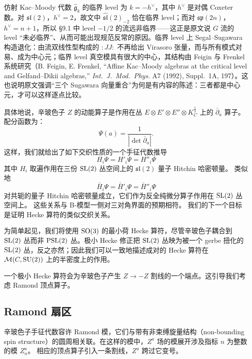 \begin{yizhu}
仿射 Kac–Moody 代数 $\hat{\mathfrak g}_k$ 的临界 level 为 $k=-h^\vee$，其中 $h^\vee$ 是对偶 Coxeter 数。对 $\mathfrak{sl}(2)$，$h^\vee=2$，故文中 $\widehat{\mathfrak{sl}}(2)_{-2}$ 恰在临界 level；而对 $\mathfrak{sp}(2n)$，$h^\vee=n+1$，所以 §9.1 中 level $-1/2$ 的流远非临界——这正是原文说 $G$ 流的 level “未必临界”、从而可能出现规范反常的原因。临界 level 上 Segal–Sugawara 构造退化：由流双线性型构成的 $:JJ:$ 不再给出 Virasoro 张量，而与所有模式对易、成为中心元；临界 level 真空模具有很大的中心，其结构由 Feigin 与 Frenkel 系统研究（B. Feigin, E. Frenkel, ``Affine Kac--Moody algebras at the critical level and Gelfand--Dikii algebras,'' \emph{Int.\ J.\ Mod.\ Phys.} A7 (1992), Suppl.~1A, 197）。这也说明原文强调“三个 Sugawara 向量重合”为何是有内容的陈述：三者都是中心元，才可以这样逐点比较。
\end{yizhu}

具体地说，辛玻色子 $Z$ 的动能算子是作用在丛 $E \otimes E' \otimes E'' \otimes K_C^{\frac12}$ 上的 $\bar \partial_{a}$ 算子。
配分函数为： 
\begin{equation}\label{sqr}
\Psi(a) = \frac{1}{|\det \bar \partial_a|}.
\end{equation}  
这样，我们就给出了如下交织性质的一个手征代数推导
\begin{equation}
\boxed{H_i \Psi = H'_i \Psi = H''_i \Psi}
\end{equation}
其中 $H_i$ 取遍作用在三份 ${\mathrm{SL}}(2)$ 丛空间上的 $\mathfrak{sl}(2)$ 量子 Hitchin 哈密顿量。
类似地
\begin{equation}
\boxed{\bar H_i \Psi = \bar H'_i \Psi = \bar H''_i \Psi}
\end{equation}
对共轭的量子 Hitchin 哈密顿量成立，它们作为反全纯微分算子作用在 ${\mathrm{SL}}(2)$ 丛空间上。
这些关系与 B-模型一侧对三对角界面的预期相符。 
我们的下一个目标是证明 Hecke 算符的类似交织关系。 

为简单起见，我们将使用 ${\mathrm{SO}}(3)$ 的最小荷 Hecke 算符，尽管辛玻色子耦合到 ${\mathrm{SL}}(2)$ 丛而非 ${\mathrm{PSL}}(2)$ 丛。极小 Hecke 修正把 ${\mathrm{SL}}(2)$ 丛映为被一个 gerbe 扭化的
${\mathrm{SL}}(2)$ 丛，反之亦然；因此我们可以一致地描述成对的 Hecke 算符在 ${\mathcal M}(C,{\mathrm{SU}}(2))$ 上的半密度上的作用。 

一个极小 Hecke 算符会为辛玻色子产生 $Z \to -Z$ 割线的一个端点。这引导我们考虑 Ramond 顶点算子。 

\subsection{Ramond 扇区} \label{sec:Ramond}
辛玻色子手征代数容许 Ramond 模，它们与带有非束缚旋量结构（non-bounding spin structure）的圆周相关联。在这样的模中，$Z^a$ 场的模展开涉及指标 $n$ 为整数的模 $Z^a_n$。
相应的顶点算子引入一条割线，$Z^a$ 跨过它变号。

